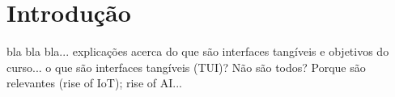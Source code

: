 \chapter{Introdução}
bla bla bla... explicações acerca do que são interfaces tangíveis e objetivos do curso...
o que são interfaces tangíveis (TUI)? Não são todos? Porque são relevantes (rise of IoT); rise of AI...